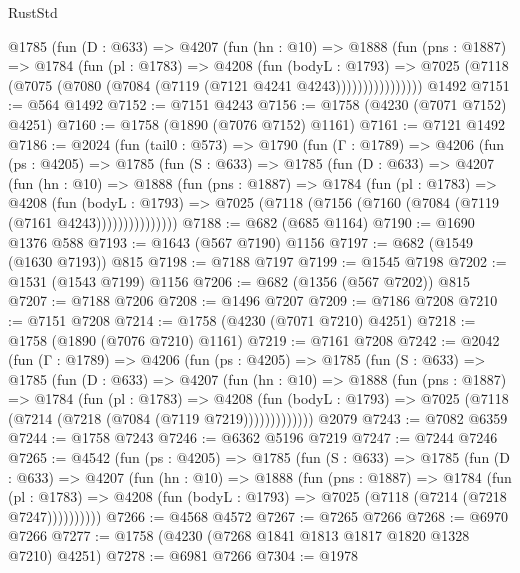 \begin{lexlean}{RustStd}
\begin{coremodule}
{\begin{coremodule}
{{{{{{{{{{{{{{{            @1785
              (fun (D : @633) =>
              @4207
                (fun (hn : @10) =>
                @1888
                  (fun (pns : @1887) =>
                  @1784
                    (fun (pl : @1783) =>
                    @4208
                      (fun (bodyL : @1793) =>
                      @7025 (@7118 (@7075 (@7080 (@7084 (@7119 (@7121 @4241 @4243))))))))))))))))
    @1492
@7151 := @564 @1492
@7152 := @7151 @4243
@7156 := @1758 (@4230 (@7071 @7152) @4251)
@7160 := @1758 (@1890 (@7076 @7152) @1161)
@7161 := @7121 @1492
@7186 := @2024
    (fun (tail0 : @573) =>
    @1790
      (fun (Γ : @1789) =>
      @4206
        (fun (ps : @4205) =>
        @1785
          (fun (S : @633) =>
          @1785
            (fun (D : @633) =>
            @4207
              (fun (hn : @10) =>
              @1888
                (fun (pns : @1887) =>
                @1784
                  (fun (pl : @1783) =>
                  @4208
                    (fun (bodyL : @1793) =>
                    @7025 (@7118 (@7156 (@7160 (@7084 (@7119 (@7161 @4243)))))))))))))))
@7188 := @682 (@685 @1164)
@7190 := @1690 @1376 @588
@7193 := @1643 (@567 @7190) @1156
@7197 := @682 (@1549 (@1630 @7193)) @815
@7198 := @7188 @7197
@7199 := @1545 @7198
@7202 := @1531 (@1543 @7199) @1156
@7206 := @682 (@1356 (@567 @7202)) @815
@7207 := @7188 @7206
@7208 := @1496 @7207
@7209 := @7186 @7208
@7210 := @7151 @7208
@7214 := @1758 (@4230 (@7071 @7210) @4251)
@7218 := @1758 (@1890 (@7076 @7210) @1161)
@7219 := @7161 @7208
@7242 := @2042
    (fun (Γ : @1789) =>
    @4206
      (fun (ps : @4205) =>
      @1785
        (fun (S : @633) =>
        @1785
          (fun (D : @633) =>
          @4207
            (fun (hn : @10) =>
            @1888
              (fun (pns : @1887) =>
              @1784
                (fun (pl : @1783) =>
                @4208
                  (fun (bodyL : @1793) =>
                  @7025 (@7118 (@7214 (@7218 (@7084 (@7119 @7219)))))))))))))
    @2079
@7243 := @7082 @6359
@7244 := @1758 @7243
@7246 := @6362 @5196 @7219
@7247 := @7244 @7246
@7265 := @4542
    (fun (ps : @4205) =>
    @1785
      (fun (S : @633) =>
      @1785
        (fun (D : @633) =>
        @4207
          (fun (hn : @10) =>
          @1888
            (fun (pns : @1887) =>
            @1784
              (fun (pl : @1783) =>
              @4208 (fun (bodyL : @1793) => @7025 (@7118 (@7214 (@7218 @7247))))))))))
@7266 := @4568 @4572
@7267 := @7265 @7266
@7268 := @6970 @7266
@7277 := @1758 (@4230 (@7268 @1841 @1813 @1817 @1820 @1328 @7210) @4251)
@7278 := @6981 @7266
@7304 := @1978
}}}}}}}}}}}}}}}
\end{coremodule}}
\end{coremodule}
\end{lexlean}
